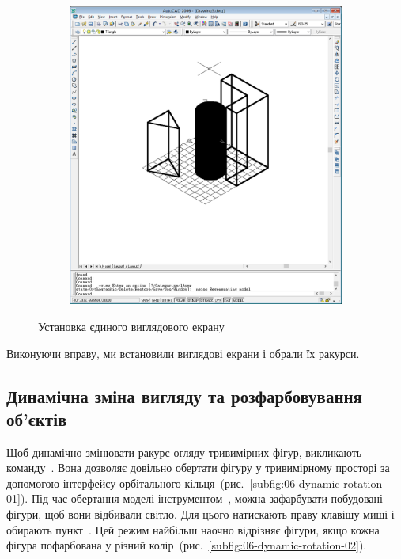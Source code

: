 \documentclass[
	a4paper,
	oneside,
	BCOR = 10mm,
	DIV = 12,
	12pt,
	headings = normal,
]{scrartcl}
\newlength{\gridunitwidth}
\begin{document}
\begin{figure}[!htbp]
\begin{subfigure}[b]{4 \gridunitwidth}
					\includegraphics[width = \columnwidth]{./assets/p14.png}
					\caption{}
					\label{subfig:05-viewport-single-02}
				\end{subfigure}
				\caption{Установка єдиного виглядового екрану}
				\label{fig:05-viewport-single}
			\end{figure}

			Виконуючи вправу, ми встановили виглядові екрани і обрали їх ракурси.

		\subsection{Динамічна зміна вигляду та розфарбовування об'єктів}
			Щоб динамічно змінювати ракурс огляду тривимірних фігур, викликають команду~. Вона дозволяє довільно обертати фігуру у тривимірному просторі за допомогою інтерфейсу орбітального кільця~(рис.~\ref{subfig:06-dynamic-rotation-01}). Під час обертання моделі інструментом~, можна зафарбувати побудовані фігури, щоб вони відбивали світло. Для цього натискають праву клавішу миші і обирають пункт~. Цей режим найбільш наочно відрізняє фігури, якщо кожна фігура пофарбована у різний колір~(рис.~\ref{subfig:06-dynamic-rotation-02}).
\end{document}
